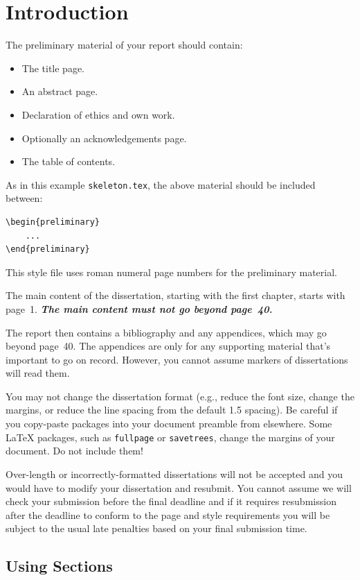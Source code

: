 \documentclass[logo,msc,draft]{infthesis}     %
\begin{document}
\chapter{Introduction}

The preliminary material of your report should contain:
\begin{itemize}
\item
The title page.
\item
An abstract page.
\item
Declaration of ethics and own work.
\item
Optionally an acknowledgements page.
\item
The table of contents.
\end{itemize}

As in this example \texttt{skeleton.tex}, the above material should be
included between:
\begin{verbatim}
\begin{preliminary}
    ...
\end{preliminary}
\end{verbatim}
This style file uses roman numeral page numbers for the preliminary material.

The main content of the dissertation, starting with the first chapter,
starts with page~1. \emph{\textbf{The main content must not go beyond page~40.}}

The report then contains a bibliography and any appendices, which may go beyond
page~40. The appendices are only for any supporting material that's important to
go on record. However, you cannot assume markers of dissertations will read them.

You may not change the dissertation format (e.g., reduce the font size, change
the margins, or reduce the line spacing from the default 1.5 spacing). Be
careful if you copy-paste packages into your document preamble from elsewhere.
Some \LaTeX{} packages, such as \texttt{fullpage} or \texttt{savetrees}, change
the margins of your document. Do not include them!

Over-length or incorrectly-formatted dissertations will not be accepted and you
would have to modify your dissertation and resubmit. You cannot assume we will
check your submission before the final deadline and if it requires resubmission
after the deadline to conform to the page and style requirements you will be
subject to the usual late penalties based on your final submission time.

\section{Using Sections}
\end{document}
